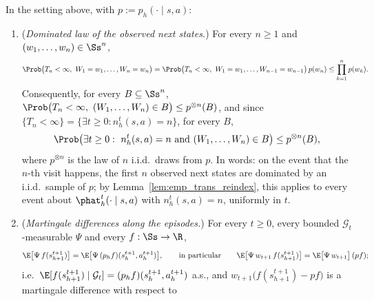\begin{lemma}\label{lem:visits_iid}
\leanok
{}
In the setting above, with $p := p_h(\cdot \mid s, a)$:
\begin{enumerate}
  \item[(i)] (\emph{Dominated law of the observed next states.}) For every $n \ge 1$ and
        $(w_1, \dots, w_n) \in \Ss^n$,
        \[
          \Prob\big(T_n < \infty,\ W_1 = w_1, \dots, W_n = w_n\big)
          = \Prob\big(T_n < \infty,\ W_1 = w_1, \dots, W_{n-1} = w_{n-1}\big)\,p(w_n)
          \le \prod_{k=1}^n p(w_k) .
        \]
        Consequently, for every $B \subseteq \Ss^n$,
        $\Prob\big(T_n < \infty,\ (W_1, \dots, W_n) \in B\big) \le p^{\otimes n}(B)$, and since
        $\{T_n < \infty\} = \{\exists t \ge 0 : n^t_h(s,a) = n\}$, for every $B$,
        \[
          \Prob\big(\exists t \ge 0 :\ n^t_h(s,a) = n \text{ and } (W_1, \dots, W_n) \in B\big)
          \le p^{\otimes n}(B) ,
        \]
        where $p^{\otimes n}$ is the law of $n$ i.i.d.\ draws from $p$. In words: on the event
        that the $n$-th visit happens, the first $n$ observed next states are dominated by an
        i.i.d.\ sample of $p$; by Lemma~\ref{lem:emp_trans_reindex}, this applies to every
        event about $\phat^t_h(\cdot \mid s,a)$ with $n^t_h(s,a) = n$, uniformly in $t$.
  \item[(ii)] (\emph{Martingale differences along the episodes.}) For every $t \ge 0$, every
        bounded $\mathcal G_t$-measurable $\Psi$ and every $f : \Ss \to \R$,
        \[
          \E\big[\Psi\, f(s^{t+1}_{h+1})\big] = \E\big[\Psi\,(p_h f)(s^{t+1}_h, a^{t+1}_h)\big] ,
          \qquad\text{in particular}\qquad
          \E\big[\Psi\, w_{t+1}\, f(s^{t+1}_{h+1})\big] = \E\big[\Psi\, w_{t+1}\big]\,(pf) ;
        \]
        i.e.\ $\E[f(s^{t+1}_{h+1}) \mid \mathcal G_t] = (p_h f)(s^{t+1}_h, a^{t+1}_h)$ a.s., and
        $w_{t+1}\big(f(s^{t+1}_{h+1}) - pf\big)$ is a martingale difference with respect to

\end{enumerate}
\end{lemma}
